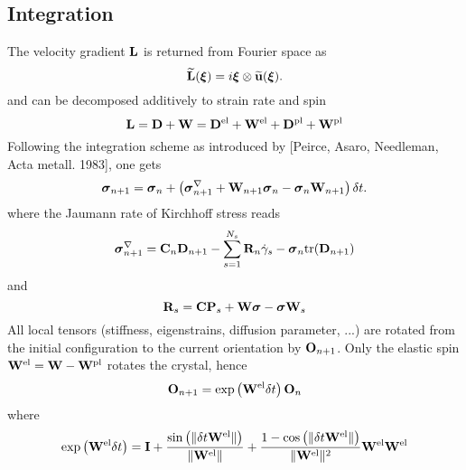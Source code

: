 \subsection*{Integration}
The velocity gradient $\mathbf{L}$ is returned from Fourier space as
\begin{equation}
  \widetilde{\mathbf{L}}(\mbox{\boldmath $\xi$}) = i \mbox{\boldmath $\xi$} \otimes\widetilde{\mathbf{u}}(\mbox{\boldmath $\xi$}).
\end{equation}
and can be decomposed additively to strain rate and spin
\begin{equation}
 \mathbf{L} = \mathbf{D} + \mathbf{W} = \mathbf{D}^{\mathrm{el}} + \mathbf{W}^{\mathrm{el}} + \mathbf{D}^{\mathrm{pl}} + \mathbf{W}^{\mathrm{pl}}
\end{equation}
Following the integration scheme as introduced by [Peirce, Asaro, Needleman, Acta metall. 1983], one gets
\begin{equation}
  \mbox{\boldmath $\sigma$}_{n+1} = \mbox{\boldmath $\sigma$}_{n} + \left(\mbox{\boldmath $\sigma$}_{n+1}^\nabla + \mathbf{W}_{n+1}\mbox{\boldmath $\sigma$}_{n} - \mbox{\boldmath $\sigma$}_{n}\mathbf{W}_{n+1}\right) \delta t.
\end{equation}
where the Jaumann rate of Kirchhoff stress reads
\begin{equation}
  \mbox{\boldmath $\sigma$}^\nabla_{n+1} = \mathcal{\mathbf{C}}_{n}\mathbf{D}_{n+1}-\sum_{s=1}^{N_s}{\mathbf{R}}_n\dot{\gamma}_s - \mbox{\boldmath $\sigma$}_n \mathrm{tr}(\mathbf{D}_{n+1})
\end{equation}
and
\begin{equation}
\mathbf{R}_s = \mathcal{\mathbf{C}} \mathbf{P}_s + \mathbf{W} \mbox{\boldmath $\sigma$} - \mbox{\boldmath $\sigma$} \mathbf{W}_s
\end{equation}
All local tensors (stiffness, eigenstrains, diffusion parameter, ...) are rotated from the initial configuration to the current orientation by $\mathbf{O}_{n+1}$. Only the elastic spin $\mathbf{W}^{\mathrm{el}} = \mathbf{W} - \mathbf{W}^{\mathrm{pl}}$ rotates the crystal, hence 
\begin{equation}
 \mathbf{O}_{n+1} = \exp\left(\mathbf{W}^{\mathrm{el}}\delta t\right)\mathbf{O}_{n}
\end{equation}
where
\begin{equation}
\exp\left(\mathbf{W}^{\mathrm{el}}\delta t\right) = \mathbf{I} + \frac{\sin \left(\|\delta t\mathbf{W}^{\mathrm{el}}\|\right)}{\|\mathbf{W}^{\mathrm{el}}\|}+\frac{1-\cos \left(\|\delta t\mathbf{W}^{\mathrm{el}}\|\right)}{\|\mathbf{W}^{\mathrm{el}}\|^2}\mathbf{W}^{\mathrm{el}}\mathbf{W}^{\mathrm{el}}
\end{equation}
